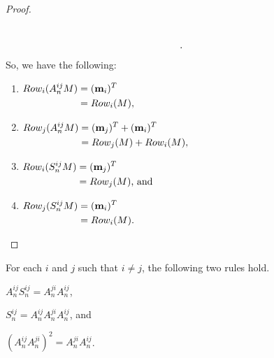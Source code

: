 \begin{proof}
\begin{align*}
\begin{matrix}
            \vphantom{(\m_{i})^T}   \\
            \vphantom{\vdots}.
        \end{matrix}
    \end{align*}
    So, we have the following:
    \begin{enumerate}
    \item $\begin{aligned}[t]
        Row_i(A_n^{ij} M) &= (\mathbf{m}_i)^T \\
                           &= Row_i(M),
        \end{aligned}$
    \item $\begin{aligned}[t]
            Row_j(A_n^{ij} M) &= (\mathbf{m}_j)^T + (\mathbf{m}_i)^T \\
                               &= Row_j(M) + Row_i(M),
        \end{aligned}$
    \item $\begin{aligned}[t]
            Row_i(S_n^{ij} M) &= (\mathbf{m}_j)^T \\
            &= Row_j(M) \text{, and}
        \end{aligned}$
    \item $\begin{aligned}[t]
            Row_j(S_n^{ij} M) &= (\mathbf{m}_i)^T \\
            &= Row_i(M).
        \end{aligned}$
    \end{enumerate}
\end{proof}

\begin{Proposition} \label{prop:s2a}
    For each $ i $ and $ j $ such that $ i \neq j $, the following two rules hold. \\
    \begin{enumerate*}
    \item $ A_n^{ij} S_n^{ij} = A_n^{ji} A_n^{ij} $,
    \item $ S_n^{ij} = A_n^{ij} A_n^{ji} A_n^{ij} $, and
    \item $ \left(A_n^{ij} A_n^{ji} \right)^2 = A_n^{ji} A_n^{ij} $.
    \end{enumerate*}
\end{Proposition}

